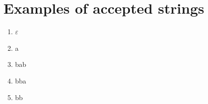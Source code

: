\section{Examples of accepted strings}
\begin{enumerate}
\item $ \varepsilon $
\item a
\item bab
\item bba
\item bb
\end{enumerate}

